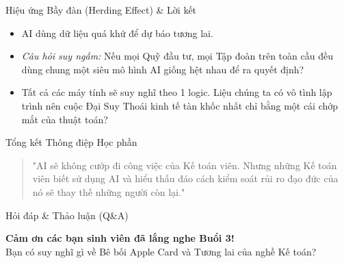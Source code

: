 \documentclass[aspectratio=169,12pt]{beamer}
\begin{document}
\begin{frame}{Hiệu ứng Bầy đàn (Herding Effect) \& Lời kết}
    \begin{itemize}
        \item AI dùng dữ liệu quá khứ để dự báo tương lai.
        \item \textit{Câu hỏi suy ngẫm:} Nếu mọi Quỹ đầu tư, mọi Tập đoàn trên toàn cầu đều dùng chung một siêu mô hình AI giống hệt nhau để ra quyết định?
        \item Tất cả các máy tính sẽ suy nghĩ theo 1 logic. Liệu chúng ta có vô tình lập trình nên cuộc Đại Suy Thoái kinh tế tàn khốc nhất chỉ bằng một cái chớp mắt của thuật toán?
    \end{itemize}
\end{frame}

\begin{frame}{Tổng kết Thông điệp Học phần}
    \begin{quote}
        "AI sẽ không cướp đi công việc của Kế toán viên. Nhưng những Kế toán viên biết sử dụng AI và hiểu thấu đáo cách kiểm soát rủi ro đạo đức của nó sẽ thay thế những người còn lại."
    \end{quote}
\end{frame}

\begin{frame}{Hỏi đáp \& Thảo luận (Q\&A)}
    \begin{center}
        \Large \textbf{Cảm ơn các bạn sinh viên đã lắng nghe Buổi 3!}\\
        \vspace{1cm}
        Bạn có suy nghĩ gì về Bê bối Apple Card và Tương lai của nghề Kế toán?
    \end{center}
\end{frame}
\end{document}
